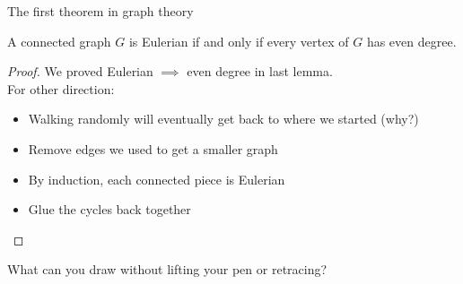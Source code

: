 \documentclass{beamer}
\begin{document}
\begin{frame}{The first theorem in graph theory}
  \begin{theorem}[Euler] A connected graph $G$ is Eulerian if and only if every vertex of $G$ has even degree.
  \end{theorem}
  \begin{proof}
    We proved Eulerian $\implies$ even degree in last lemma. \\
    For other direction:
    \begin{itemize}
    \item Walking randomly will eventually get back to where we started (why?)
    \item Remove edges we used to get a smaller graph
    \item By induction, each connected piece is Eulerian 
    \item Glue the cycles back together
    \end{itemize}
  \end{proof}
\end{frame}





\begin{frame}{What can you draw without lifting your pen or retracing?}





\end{frame}
\end{document}
